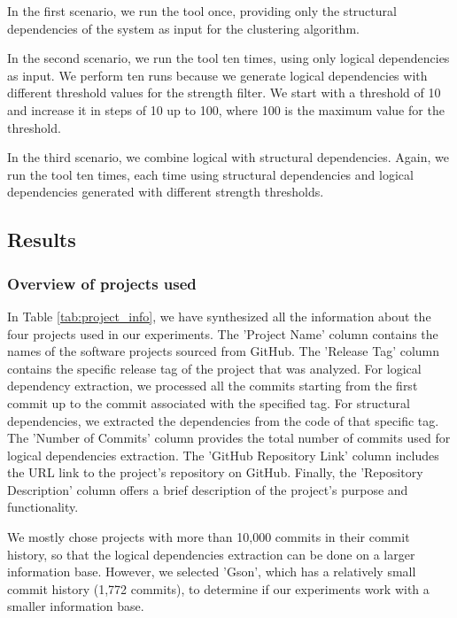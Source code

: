 \documentclass{ieeeaccess}
\begin{document}
In the first scenario, we run the tool once, providing only the structural dependencies of the system as input for the clustering algorithm.

In the second scenario, we run the tool ten times, using only logical dependencies as input. We perform ten runs because we generate logical dependencies with different threshold values for the strength filter. We start with a threshold of 10 and increase it in steps of 10 up to 100, where 100 is the maximum value for the threshold.

In the third scenario, we combine logical with structural dependencies. Again, we run the tool ten times, each time using structural dependencies and logical dependencies generated with different strength thresholds.




\subsection{Results}
\label{subsec:results}

\subsubsection{Overview of projects used}


In Table \ref{tab:project_info}, we have synthesized all the information about the four projects used in our experiments. The 'Project Name' column contains the names of the software projects sourced from GitHub. The 'Release Tag' column contains the specific release tag of the project that was analyzed. For logical dependency extraction, we processed all the commits starting from the first commit up to the commit associated with the specified tag. For structural dependencies, we extracted the dependencies from the code of that specific tag. The 'Number of Commits' column provides the total number of commits used for logical dependencies extraction. The 'GitHub Repository Link' column includes the URL link to the project's repository on GitHub. Finally, the 'Repository Description' column offers a brief description of the project's purpose and functionality.


We mostly chose projects with more than 10,000 commits in their commit history, so that the logical dependencies extraction can be done on a larger information base. However, we selected 'Gson', which has a relatively small commit history (1,772 commits), to determine if our experiments work with a smaller information base.
\end{document}
